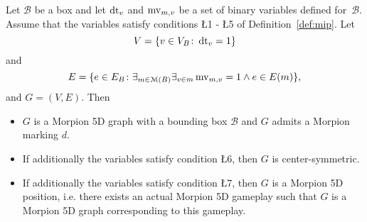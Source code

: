\begin{lemma}
\label{lem:solutions}
  Let ${\mathcal B}$ be a box and let $\operatorname{dt}_v$ and $\operatorname{mv}_{m, v}$ be a set of binary variables defined for~$\mathcal{B}$. Assume that the variables satisfy conditions \L{1} - \L{5} of Definition~\ref{def:mip}.
  Let
 \[
    V = \{ v \in V_B \colon \operatorname{dt}_v = 1 \}
\]
 and
 \[
    E = \{ e \in E_B \colon \exists_{m \in \mathcal{M}(B)} \exists_{v \in m} \operatorname{mv}_{m, v} = 1 \wedge e  \in E(m) \},
  \]
  and $G = (V, E)$. Then
 \begin{itemize}
\item $G$ is a Morpion 5D graph with a bounding box $\mathcal{B}$ and $G$ admits a Morpion marking $d$.
\item If additionally the variables satisfy condition \L{6}, then $G$ is center-symmetric. 
\item If additionally the variables satisfy condition \L{7}, then $G$ is a Morpion 5D position, i.e. there exists an actual Morpion 5D gameplay such that $G$ is a Morpion 5D graph corresponding to this gameplay.
\end{itemize}
\end{lemma}
